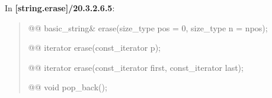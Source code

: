 \documentclass{wg21}
\begin{document}
In \textbf{[string.erase]/20.3.2.6.5}:
\begin{quote}
\begin{itemdecl}
@@ basic_string& erase(size_type pos = 0, size_type n = npos);
\end{itemdecl}

\begin{itemdecl}
@@ iterator erase(const_iterator p);
\end{itemdecl}

\begin{itemdecl}
@@ iterator erase(const_iterator first, const_iterator last);
\end{itemdecl}

\begin{itemdecl}
@@ void pop_back();
\end{itemdecl}
\end{quote}
\end{document}
